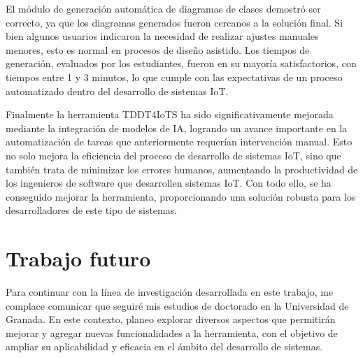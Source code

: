 El módulo de generación automática de diagramas de clases demostró ser correcto, ya que los diagramas generados fueron cercanos a la solución final. Si bien algunos usuarios indicaron la necesidad de realizar ajustes manuales menores, esto es normal en procesos de diseño asistido. Los tiempos de generación, evaluados por los estudiantes, fueron en su mayoría satisfactorios, con tiempos entre 1 y 3 minutos, lo que cumple con las expectativas de un proceso automatizado dentro del desarrollo de sistemas IoT.

Finalmente la herramienta TDDT4IoTS ha sido significativamente mejorada mediante la integración de modelos de IA, logrando un avance importante en la automatización de tareas que anteriormente requerían intervención manual. Esto no solo mejora la eficiencia del proceso de desarrollo de sistemas IoT, sino que también trata de minimizar los errores humanos, aumentando la productividad de los ingenieros de software que desarrollen sistemas IoT. Con todo ello, se ha conseguido mejorar la herramienta, proporcionando una solución robusta para los desarrolladores de este tipo de sistemas.

\section{Trabajo futuro}

Para continuar con la línea de investigación desarrollada en este trabajo, me complace comunicar que seguiré mis estudios de doctorado en la Universidad de Granada. En este contexto, planeo explorar diversos aspectos que permitirán mejorar y agregar nuevas funcionalidades a la herramienta, con el objetivo de ampliar su aplicabilidad y eficacia en el ámbito del desarrollo de sistemas.


